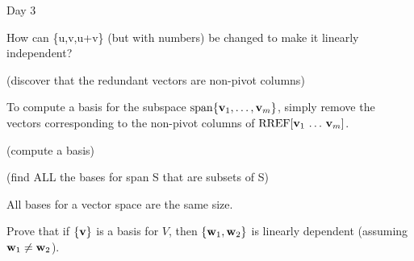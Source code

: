 
\begin{applicationActivities}{Day 3}

\begin{activity}{10}
  How can \{u,v,u+v\} (but with numbers) be changed to make it
  linearly independent?
\end{activity}

\begin{activity}{10}
  (discover that the redundant vectors are non-pivot columns)
\end{activity}

\begin{fact}
  To compute a basis for the subspace \(\operatorname{span}\{\mathbf v_1,\dots,\mathbf v_m\}\),
  simply remove the vectors corresponding to the non-pivot columns of
  \(\operatorname{RREF}[\mathbf v_1\,\dots\,\mathbf v_m]\).
\end{fact}

\begin{activity}{10}
  (compute a basis)
\end{activity}

\begin{activity}{10}
  (find ALL the bases for span S that are subsets of S)
\end{activity}

\begin{fact}
  All bases for a vector space are the same size.
\end{fact}

\begin{activity}{10}
  Prove that if \(\{\mathbf v\}\) is a basis for \(V\),
  then \(\{\mathbf w_1,\mathbf w_2\}\) is linearly dependent (assuming
  \(\mathbf w_1\not=\mathbf w_2\)).
\end{activity}

\end{applicationActivities}
